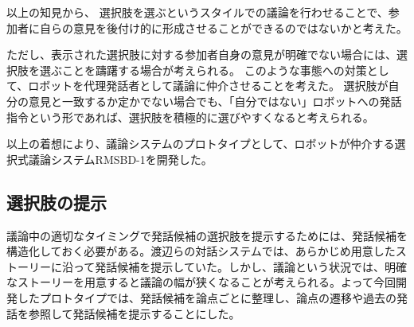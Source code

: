 \documentclass[11pt, a4paper]{jreport} %
\begin{document}
以上の知見から、
選択肢を選ぶというスタイルでの議論を行わせることで、参加者に自らの意見を後付け的に形成させることができるのではないかと考えた。



ただし、表示された選択肢に対する参加者自身の意見が明確でない場合には、選択肢を選ぶことを躊躇する場合が考えられる。
このような事態への対策として、ロボットを代理発話者として議論に仲介させることを考えた。
選択肢が自分の意見と一致するか定かでない場合でも、「自分ではない」ロボットへの発話指令という形であれば、選択肢を積極的に選びやすくなると考えられる。









以上の着想により、議論システムのプロトタイプとして、ロボットが仲介する選択式議論システムRMSBD-1を開発した。%


\subsection{選択肢の提示}
議論中の適切なタイミングで発話候補の選択肢を提示するためには、発話候補を構造化しておく必要がある。渡辺ら\cite{渡辺美紀2017}の対話システムでは、あらかじめ用意したストーリーに沿って発話候補を提示していた。しかし、議論という状況では、明確なストーリーを用意すると議論の幅が狭くなることが考えられる。よって今回開発したプロトタイプでは、発話候補を論点ごとに整理し、論点の遷移や過去の発話を参照して発話候補を提示することにした。







\end{document}
